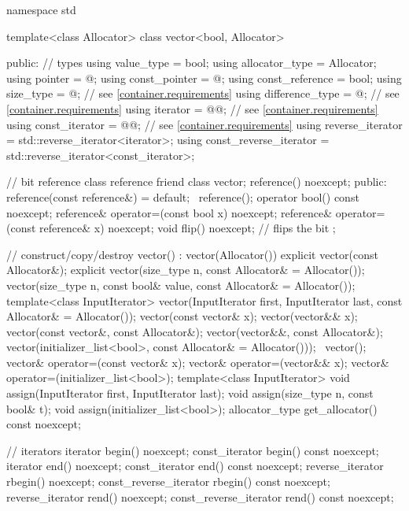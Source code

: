 \begin{codeblock}
namespace std {
  template<class Allocator>
  class vector<bool, Allocator> {
  public:
    // types
    using value_type             = bool;
    using allocator_type         = Allocator;
    using pointer                = @\impdef@;
    using const_pointer          = @\impdef@;
    using const_reference        = bool;
    using size_type              = @\impdef@; // see \ref{container.requirements}
    using difference_type        = @\impdef@; // see \ref{container.requirements}
    using iterator               = @@; // see \ref{container.requirements}
    using const_iterator         = @@; // see \ref{container.requirements}
    using reverse_iterator       = std::reverse_iterator<iterator>;
    using const_reverse_iterator = std::reverse_iterator<const_iterator>;

    // bit reference
    class reference {
      friend class vector;
      reference() noexcept;
    public:
      reference(const reference&) = default;
      ~reference();
      operator bool() const noexcept;
      reference& operator=(const bool x) noexcept;
      reference& operator=(const reference& x) noexcept;
      void flip() noexcept;     // flips the bit
    };

    // construct/copy/destroy
    vector() : vector(Allocator()) { }
    explicit vector(const Allocator&);
    explicit vector(size_type n, const Allocator& = Allocator());
    vector(size_type n, const bool& value, const Allocator& = Allocator());
    template<class InputIterator>
      vector(InputIterator first, InputIterator last, const Allocator& = Allocator());
    vector(const vector& x);
    vector(vector&& x);
    vector(const vector&, const Allocator&);
    vector(vector&&, const Allocator&);
    vector(initializer_list<bool>, const Allocator& = Allocator()));
    ~vector();
    vector& operator=(const vector& x);
    vector& operator=(vector&& x);
    vector& operator=(initializer_list<bool>);
    template<class InputIterator>
      void assign(InputIterator first, InputIterator last);
    void assign(size_type n, const bool& t);
    void assign(initializer_list<bool>);
    allocator_type get_allocator() const noexcept;

    // iterators
    iterator               begin() noexcept;
    const_iterator         begin() const noexcept;
    iterator               end() noexcept;
    const_iterator         end() const noexcept;
    reverse_iterator       rbegin() noexcept;
    const_reverse_iterator rbegin() const noexcept;
    reverse_iterator       rend() noexcept;
    const_reverse_iterator rend() const noexcept;

}}
\end{codeblock}
